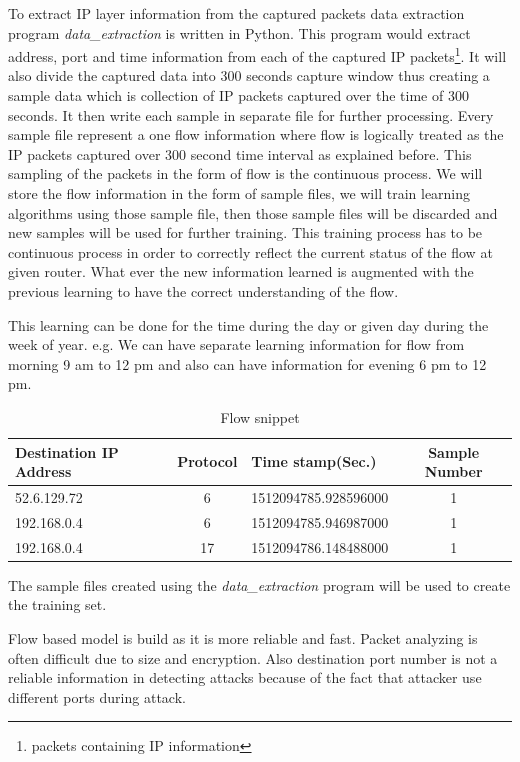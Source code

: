 \documentclass[10pt,oneside,a4paper]{article}
\begin{document}
To extract IP layer information from the captured packets data extraction program \textit{data\_extraction} is written in Python. This program would extract address, port and time information from each of the captured IP packets\footnote{packets containing IP information}. It will also divide the captured data into 300 seconds capture window thus creating a sample data which is collection of IP packets captured over the time of 300 seconds. It then write each sample in separate file for further processing. Every sample file represent a one flow information where flow is logically treated as the IP packets captured over 300 second time interval as explained before. This sampling of the packets in the form of flow is the continuous process. We will store the flow information in the form of sample files, we will train learning algorithms using those sample file, then those sample files will be discarded and new samples will be used for further training. This training process has to be continuous process in order to correctly reflect the current status of the flow at given router. What ever the new information learned is augmented with the previous learning to have the correct understanding of the flow.

This learning can be done for the time during the day or given day during the week of year. e.g. We can have separate learning information for flow from morning 9 am to 12 pm and also can have information for evening 6 pm to 12 pm.

\begin{table}[H]
\centering
  \begin{tabular}{| l | c | l | c |}
    \hline
    Destination IP Address      & Protocol  & Time stamp(Sec.)  & Sample Number \\
    \hline
    52.6.129.72         & 6         & 1512094785.928596000  & 1 \\ \hline
    192.168.0.4         & 6         & 1512094785.946987000  & 1 \\ \hline
    192.168.0.4         & 17        & 1512094786.148488000  & 1 \\ \hline
  \end{tabular}
\caption{Flow snippet} \label{table:flow-snippet}
\end{table}

The sample files created using the \textit{data\_extraction} program will be used to create the training set.

Flow based model is build as it is more reliable and fast. Packet analyzing is often difficult due to size and encryption. Also destination port number is not a reliable information in detecting attacks because of the fact that attacker use different ports during attack.
\end{document}
